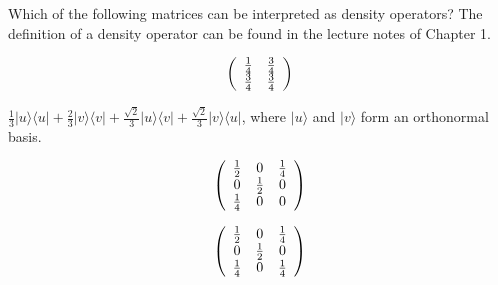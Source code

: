 \documentclass[a4paper,10pt,landscape,twocolumn]{scrartcl}
\newcommand{\ket}[1]{| #1 \rangle}
\newcommand{\bra}[1]{\langle #1 |}
\begin{document}
\begin{exercise}
Which of the following matrices can be interpreted as density operators? The definition of a density operator can be found in the lecture notes of Chapter 1.
\begin{subex}
\[
\left(
\begin{array}{c c}
\frac{1}{4}& \frac{3}{4}\\
\frac{3}{4}& \frac{3}{4}
\end{array}
\right)
\]
\end{subex}
\begin{subex}
$\frac{1}{3}\ket{u}\bra{u} + \frac{2}{3}\ket{v}\bra{v} + \frac{\sqrt{2}}{3}\ket{u}\bra{v} + \frac{\sqrt{2}}{3}\ket{v}\bra{u}$, where $\ket{u}$ and $\ket{v}$ form an orthonormal basis.
\end{subex}
\begin{subex}
\[
\left(
\begin{array}{c c c}
\frac{1}{2}& 0 & \frac{1}{4}\\
0 & \frac{1}{2} & 0\\
\frac{1}{4} & 0 & 0\\
\end{array}
\right)
\]
\end{subex}
\begin{subex}
\[
\left(
\begin{array}{c c c}
\frac{1}{2}& 0 & \frac{1}{4}\\
0 & \frac{1}{2} & 0\\
\frac{1}{4} & 0 & \frac{1}{4}\\
\end{array}
\right)
\]
\end{subex}
\end{exercise}
\end{document}
